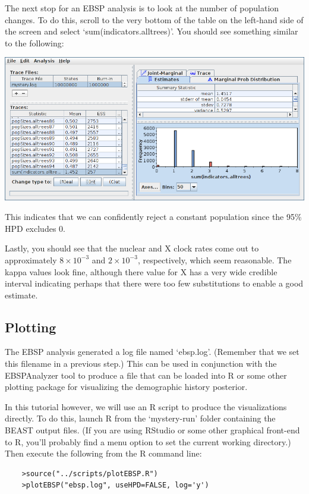 \documentclass[a4paper,11pt]{article}
\begin{document}
The next stop for an EBSP analysis is to look at the number of population
changes. To do this, scroll to the very bottom of the table on the left-hand
side of the screen and select `sum(indicators.alltrees)'.  You should see
something similar to the following:

\includegraphics[width=\textwidth]{figures/tracer2.png}

This indicates that we can confidently reject a constant population since the
95\% HPD excludes 0.

Lastly, you should see that the nuclear and X clock rates come out to
approximately $8\times 10^{-3}$ and $2\times 10^{-3}$, respectively, which seem
reasonable.  The kappa values look fine, although there value for X has a very
wide credible interval indicating perhaps that there were too few substitutions
to enable a good estimate.

\subsection{Plotting}

The EBSP analysis generated a log file named `ebsp.log'.  (Remember that we set
this filename in a previous step.)  This can be used in conjunction with the
EBSPAnalyzer tool to produce a file that can be loaded into R or some other
plotting package for visualizing the demographic history posterior.

In this tutorial however, we will use an R script to produce the visualizations
directly. To do this, launch R from the `mystery-run' folder containing the
BEAST output files. (If you are using RStudio or some other graphical front-end
to R, you'll probably find a menu option to set the current working directory.)
Then execute the following from the R command line:
\begin{verbatim}
    >source("../scripts/plotEBSP.R")
    >plotEBSP("ebsp.log", useHPD=FALSE, log='y')
\end{verbatim}
\end{document}
